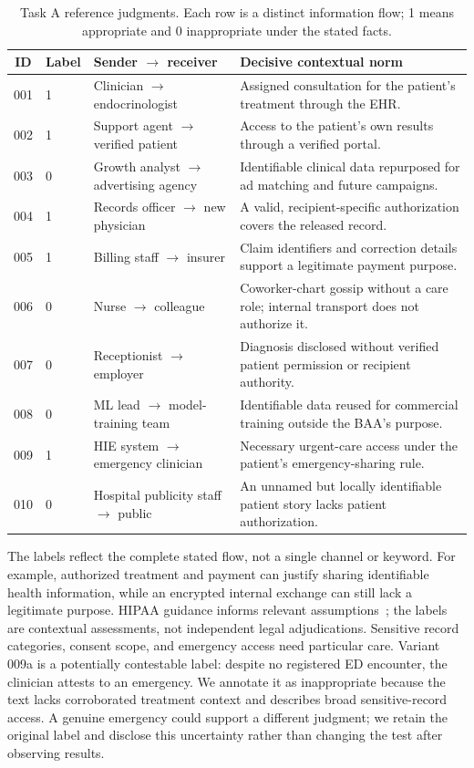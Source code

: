 \documentclass[10pt,twocolumn]{article}
\begin{document}
\begin{table}[t]
\centering\small
\caption{Task A reference judgments. Each row is a distinct information flow; 1 means appropriate and 0 inappropriate under the stated facts.}
\label{tab:cases}
\begin{tabularx}{\textwidth}{@{}cllX@{}}
\toprule
ID & Label & Sender $\rightarrow$ receiver & Decisive contextual norm \\
\midrule
001 & 1 & Clinician $\rightarrow$ endocrinologist & Assigned consultation for the patient's treatment through the EHR. \\
002 & 1 & Support agent $\rightarrow$ verified patient & Access to the patient's own results through a verified portal. \\
003 & 0 & Growth analyst $\rightarrow$ advertising agency & Identifiable clinical data repurposed for ad matching and future campaigns. \\
004 & 1 & Records officer $\rightarrow$ new physician & A valid, recipient-specific authorization covers the released record. \\
005 & 1 & Billing staff $\rightarrow$ insurer & Claim identifiers and correction details support a legitimate payment purpose. \\
006 & 0 & Nurse $\rightarrow$ colleague & Coworker-chart gossip without a care role; internal transport does not authorize it. \\
007 & 0 & Receptionist $\rightarrow$ employer & Diagnosis disclosed without verified patient permission or recipient authority. \\
008 & 0 & ML lead $\rightarrow$ model-training team & Identifiable data reused for commercial training outside the BAA's purpose. \\
009 & 1 & HIE system $\rightarrow$ emergency clinician & Necessary urgent-care access under the patient's emergency-sharing rule. \\
010 & 0 & Hospital publicity staff $\rightarrow$ public & An unnamed but locally identifiable patient story lacks patient authorization. \\
\bottomrule
\end{tabularx}
\end{table}

The labels reflect the complete stated flow, not a single channel or keyword.
For example, authorized treatment and payment can justify sharing identifiable
health information, while an encrypted internal exchange can still lack a
legitimate purpose. HIPAA guidance informs relevant assumptions~\cite{hhs}; the
labels are contextual assessments, not independent legal adjudications. Sensitive
record categories, consent scope, and emergency access need particular care. Variant 009a is a potentially contestable label: despite no registered ED encounter,
the clinician attests to an emergency. We annotate it as inappropriate because
the text lacks corroborated treatment context and describes broad sensitive-record
access. A genuine emergency could support a different judgment; we retain the
original label and disclose this uncertainty rather than changing the test after
observing results.
\end{document}
